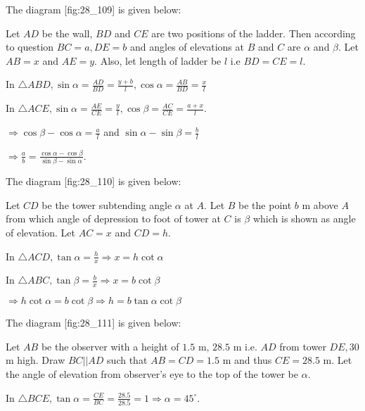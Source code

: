 \item The diagram [fig:28_109] is given below:

  \startplacefigure[reference=fig:28_109]
    \externalfigure[28_109.pdf]
  \stopplacefigure

  Let $AD$ be the wall, $BD$ and $CE$ are two positions of the ladder. Then according to question $BC =
  a, DE = b$ and angles of elevations at $B$ and $C$ are $\alpha$ and $\beta$. Let $AB = x$ and
  $AE = y$. Also, let length of ladder be $l$ i.e $BD = CE = l$.

  In $\triangle ABD, \sin\alpha = \frac{AD}{BD} = \frac{y + b}{l}, \cos\alpha = \frac{AB}{BD} = \frac{x}{l}$

  In $\triangle ACE, \sin\alpha = \frac{AE}{CE} = \frac{y}{l}, \cos\beta = \frac{AC}{CE} = \frac{a + x}{l}$.

  $\Rightarrow \cos\beta - \cos\alpha = \frac{a}{l}$ and $\sin\alpha - \sin\beta = \frac{b}{l}$

  $\Rightarrow \frac{a}{b} = \frac{\cos\alpha - \cos\beta}{\sin\beta - \sin\alpha}$.

\item The diagram [fig:28_110] is given below:

  \startplacefigure[reference=fig:28_110]
    \externalfigure[28_110.pdf]
  \stopplacefigure

  Let $CD$ be the tower subtending angle $\alpha$ at $A$. Let $B$ be the point $b$ m above
  $A$ from which angle of depression to foot of tower at $C$ is $\beta$ which is shown as angle of elevation.
  Let $AC = x$ and $CD = h$.

  In $\triangle ACD, \tan\alpha = \frac{h}{x} \Rightarrow x = h\cot\alpha$

  In $\triangle ABC, \tan\beta = \frac{b}{x} \Rightarrow x = b\cot\beta$

  $\Rightarrow h\cot\alpha = b\cot\beta \Rightarrow h = b\tan\alpha\cot\beta$
\item The diagram [fig:28_111] is given below:

  \startplacefigure[reference=fig:28_111]
    \externalfigure[28_111.pdf]
  \stopplacefigure

  Let $AB$ be the observer with a height of $1.5$ m, $28.5$ m i.e. $AD$ from tower $DE, 30$ m
  high. Draw $BC||AD$ such that $AB = CD = 1.5$ m and thus $CE = 28.5$ m. Let the angle of elevation from
  observer's eye to the top of the tower be $\alpha$.

  In $\triangle BCE, \tan\alpha = \frac{CE}{BC} = \frac{28.5}{28.5} = 1\Rightarrow \alpha = 45^\circ$.

